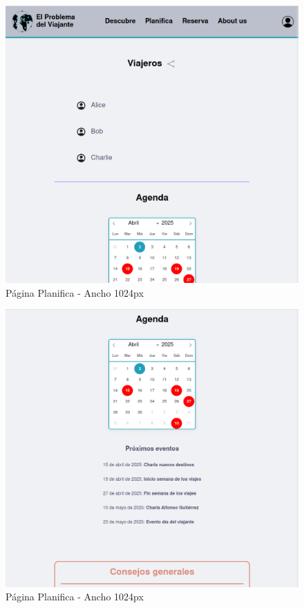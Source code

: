 \documentclass[11pt, a4paper]{book}
\begin{document}
	\begin{figure} [H]
		\centering
		\includegraphics[height=0.4\textheight]{CSS/2-3 1024.png}
		\caption{Página Planifica - Ancho 1024px}
	\end{figure}
	\begin{figure} [H]
		\centering
		\includegraphics[height=0.4\textheight]{CSS/2-4 1024.png}
		\caption{Página Planifica - Ancho 1024px}
	\end{figure}
\end{document}

